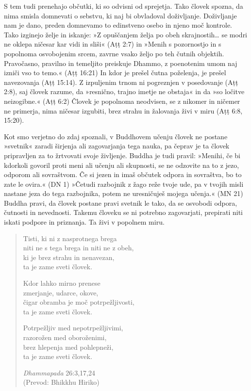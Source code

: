 S tem tudi prenehajo občutki, ki so odvisni od sprejetja. Tako človek
spozna, da nima smisla domnevati o sebstvu, ki naj bi obvladoval
doživljanje. Doživljanje nam je dano, preden domnevamo to edinstveno
osebo in njeno moč kontrole. Tako izginejo želje in iskanje: »Z
opuščanjem želja po obeh skrajnostih\ldots{} se modri ne oklepa ničesar
kar vidi in sliši« (Aṭṭ 2:7) in »Menih s pozornostjo in s popolnoma
osvobojenim srcem, zavrne vsako željo po teh čutnih objektih.
Pravočasno, pravilno in temeljito preiskuje Dhammo, z poenotenim umom
naj izniči vso to temo.« (Aṭṭ 16:21) In kdor je prešel čutna poželenja,
je prešel navezovanja (Aṭṭ 15:14). Z izpuljenim trnom ni pogreznjen v
posedovanje (Aṭṭ 2:8), saj človek razume, da »resnično, trajno imetje ne
obstaja« in da »so ločitve neizogibne.« (Aṭṭ 6:2) Človek je popolnoma
neodvisen, se z nikomer in ničemer ne primerja, nima ničesar izgubiti,
brez strahu in žalovanja živi v miru (Aṭṭ 6:8, 15:20).

Kot smo verjetno do zdaj spoznali, v Buddhovem učenju človek ne
postane »svetnik« zaradi širjenja ali zagovarjanja tega nauka, pa
čeprav je ta človek pripravljen za to žrtvovati svoje življenje. Buddha
je tudi pravil: »Menihi, če bi kdorkoli govoril proti meni ali učenju
ali skupnosti, se ne odzovite na to z jezo, odporom ali sovraštvom. Če
si jezen in imaš občutek odpora in sovraštva, bo to zate le ovira.« (DN
1) »Četudi razbojnik z žago reže tvoje ude, pa v tvojih misli nastane
jeza do tega razbojnika, potem ne uresničuješ mojega učenja.« (MN 21)
Buddha pravi, da človek postane pravi svetnik le tako, da se osvobodi
odpora, čutnosti in nevednosti. Takemu človeku se ni potrebno
zagovarjati, prepirati niti iskati podpore in priznanja. Ta živi v
popolnem miru.

{\setlength{\stanzaskip}{0.5\baselineskip}
\begin{verse}

Tisti, ki ni z nasprotnega brega\\
niti ne s tega brega in niti ne z obeh,\\
ki je brez strahu in nenavezan,\\
ta je zame sveti človek. 

Kdor lahko mirno prenese\\
zmerjanje, udarce, okove,\\
čigar obramba je moč potrpežljivosti,\\
ta je zame sveti človek. 

Potrpežljiv med nepotrpežljivimi,\\
razorožen med oboroženimi,\\
brez hlepenja med pohlepneži,\\
ta je zame sveti človek. 

\emph{Dhammapada} 26:3,17,24\\
(Prevod: Bhikkhu Hiriko)
\end{verse}}

